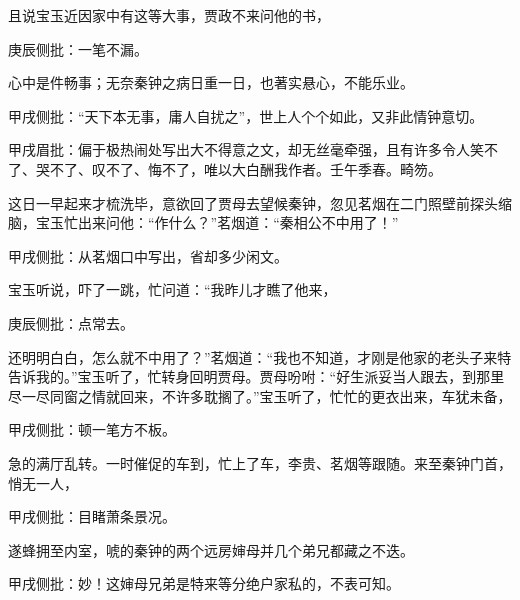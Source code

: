 \begin{parag}


    且说宝玉近因家中有这等大事，贾政不来问他的书，\begin{note}庚辰侧批：一笔不漏。\end{note}心中是件畅事；无奈秦钟之病日重一日，也著实悬心，不能乐业。\begin{note}甲戌侧批：“天下本无事，庸人自扰之”，世上人个个如此，又非此情钟意切。\end{note}\begin{note}甲戌眉批：偏于极热闹处写出大不得意之文，却无丝毫牵强，且有许多令人笑不了、哭不了、叹不了、悔不了，唯以大白酬我作者。壬午季春。畸笏。\end{note}这日一早起来才梳洗毕，意欲回了贾母去望候秦钟，忽见茗烟在二门照壁前探头缩脑，宝玉忙出来问他：“作什么？”茗烟道：“秦相公不中用了！”\begin{note}甲戌侧批：从茗烟口中写出，省却多少闲文。\end{note}宝玉听说，吓了一跳，忙问道：“我昨儿才瞧了他来，\begin{note}庚辰侧批：点常去。\end{note}还明明白白，怎么就不中用了？”茗烟道：“我也不知道，才刚是他家的老头子来特告诉我的。”宝玉听了，忙转身回明贾母。贾母吩咐：“好生派妥当人跟去，到那里尽一尽同窗之情就回来，不许多耽搁了。”宝玉听了，忙忙的更衣出来，车犹未备，\begin{note}甲戌侧批：顿一笔方不板。\end{note}急的满厅乱转。一时催促的车到，忙上了车，李贵、茗烟等跟随。来至秦钟门首，悄无一人，\begin{note}甲戌侧批：目睹萧条景况。\end{note}遂蜂拥至内室，唬的秦钟的两个远房婶母并几个弟兄都藏之不迭。\begin{note}甲戌侧批：妙！这婶母兄弟是特来等分绝户家私的，不表可知。\end{note}
\end{parag}


